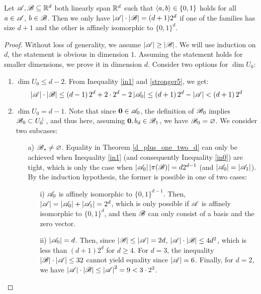 \begin{theorem}\label{uniq}
    Let ${\mathscr{A}},{\mathscr{B}} \subseteq {\mathbb{R}}^d$ both linearly span ${\mathbb{R}}^d$ such that $\langle a, b\rangle \in \{0,1\}$ holds for all $a \in {\mathscr{A}}$, $b \in {\mathscr{B}}$. Then we only have $|{\mathscr{A}}| \cdot |{\mathscr{B}}| = (d+1) 2^d$ if one of the families has size $d+1$ and the other is affinely isomorphic to $\{0,1\}^d$.
\end{theorem}
\begin{proof}
     Without loss of generality, we assume $\left|{\mathscr{A}}\right| \geq \left|{\mathscr{B}}\right|$. We will use induction on $d$, the statement is obvious in dimension $1$. Assuming the statement holds for smaller dimensions, we prove it in dimension $d$. Consider two options for $\operatorname{dim}U_0$:
    \begin{enumerate}
        \item $\operatorname{dim}U_0 \leq d-2$. From Inequality \ref{in1} and \eqref{stronger5}, we get:
        \begin{equation*}
            \left|{\mathscr{A}}\right| \cdot\left|{\mathscr{B}}\right| \leq 
            \left(d - 1\right) 2^d + 2\cdot2^d - 2\left|{\mathscr{A}}_0\right| \leq
            \left(d + 1\right) 2^d - \left|{\mathscr{A}}\right| < \left(d + 1\right) 2^d
        \end{equation*}
        \item $\operatorname{dim}U_0 = d-1$. Note that since $\mathbf{0} \in {\mathscr{A}}_0$, the definition of ${\mathscr{B}}_0$ implies ${\mathscr{B}}_0 \subset U_0^\bot$, and thus here, assuming $\mathbf{0}, b_d \in {\mathscr{B}}_1$, we have ${\mathscr{B}}_0 = \varnothing$. We consider two subcases:
        \begin{enumerate}
            \item[a)]\label{uniqfirstcase} ${\mathscr{B}}_*\neq\varnothing$. Equality in Theorem \ref{d_plus_one_two_d} can only be achieved when Inequality \ref{in1} (and consequently Inequality \ref{in0}) are tight, which is only the case when  $\left|{\mathscr{A}}_0\right|\left|\pi({\mathscr{B}})\right|=d 2^{d-1}$ (and $\left|{\mathscr{A}}_0\right|=\left|{\mathscr{A}}_1\right|$). By the induction hypothesis, the former is possible in one of two cases:
            \begin{enumerate}
                \item[i)] ${\mathscr{A}}_0$ is affinely isomorphic to $\{0,1\}^{d-1}$. Then, $\left|{\mathscr{A}}\right|=\left|{\mathscr{A}}_0\right|+\left|{\mathscr{A}}_1\right|=2^d$, which is only possible if ${\mathscr{A}}$ is affinely isomorphic to $\{0,1\}^d$, and then ${\mathscr{B}}$ can only consist of a basis and the zero vector.
                \item[ii)] $\left|{\mathscr{A}}_0\right|=d$. Then, since $\left|{\mathscr{B}}\right|\leq\left|{\mathscr{A}}\right|=2d$,  $\left|{\mathscr{A}}\right|\cdot\left|{\mathscr{B}}\right|\leq4d^2$, which is less than $(d+1)2^d$ for $d\geq4$. For $d=3$, the inequality $\left|{\mathscr{B}}\right|\cdot\left|{\mathscr{A}}\right|\leq32$ cannot yield equality since $\left|{\mathscr{A}}\right|=6$. Finally, for $d=2$, we have $\left|{\mathscr{A}}\right|\cdot\left|{\mathscr{B}}\right|\leq\left|{\mathscr{A}}\right|^2=9<3\cdot2^2$.

\end{enumerate}
\end{enumerate}
\end{enumerate}
\end{proof}
